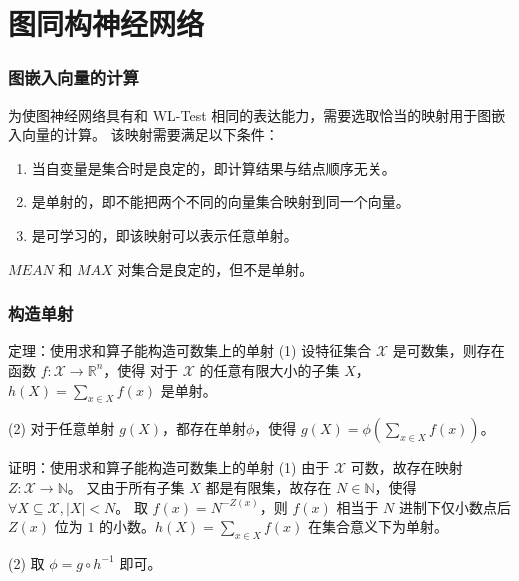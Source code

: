 \documentclass{beamer}
\begin{document}
\section{图同构神经网络}

\begin{frame}

  \frametitle{图嵌入向量的计算}
  为使图神经网络具有和 WL-Test 相同的表达能力，需要选取恰当的映射用于图嵌入向量的计算。
  该映射需要满足以下条件：
  \begin{enumerate}
    \item 当自变量是集合时是良定的，即计算结果与结点顺序无关。 
    \item 是单射的，即不能把两个不同的向量集合映射到同一个向量。 
    \item 是可学习的，即该映射可以表示任意单射。
  \end{enumerate}
  $MEAN$ 和 $MAX$ 对集合是良定的，但不是单射。

\end{frame}

\begin{frame}

  \frametitle{构造单射}
  \begin{alertblock}{定理：使用求和算子能构造可数集上的单射}
    (1) 设特征集合 $\mathcal{X}$ 是可数集，则存在函数 $f: \mathcal{X} \rightarrow \mathbb{R}^n$，使得
    对于 $\mathcal{X}$ 的任意有限大小的子集 $X$，$h(X) = \sum_{x \in X} f(x)$ 是单射。

    (2) 对于任意单射 $g(X)$，都存在单射$\phi$，使得 $g(X) = \phi(\sum_{x \in X} f(x))$。
  \end{alertblock}

  \begin{block}{证明：使用求和算子能构造可数集上的单射}
    (1) 由于 $\mathcal{X}$ 可数，故存在映射 $Z : \mathcal{X} \rightarrow \mathbb{N}$。
    又由于所有子集 $X$ 都是有限集，故存在 $N \in \mathbb{N}$，使得 $\forall X \subseteq \mathcal{X}, |X| < N$。
    取 $f(x) = N^{-Z(x)}$，则 $f(x)$ 相当于 $N$ 进制下仅小数点后 $Z(x)$ 位为 $1$ 的小数。$h(X) = \sum_{x \in X} f(x)$
    在集合意义下为单射。
    
    (2) 取 $\phi = g \circ h^{-1}$ 即可。
  \end{block}

\end{frame}
\end{document}
